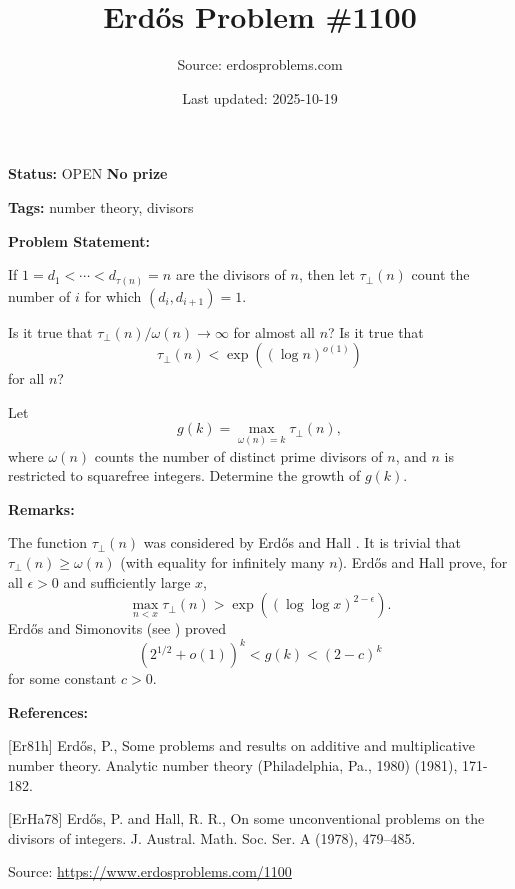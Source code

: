 \documentclass{article}
\title{Erd\H{o}s Problem \#1100}
\date{Last updated: 2025-10-19}
\author{Source: erdosproblems.com}
\begin{document}
\maketitle

\noindent\textbf{Status:} OPEN \quad \textbf{No prize}

\noindent\textbf{Tags:} number theory, divisors

\medskip
\noindent\textbf{Problem Statement:}

If $1=d_1<\cdots<d_{\tau(n)}=n$ are the divisors of $n$, then let $\tau_\perp(n)$ count the number of $i$ for which $(d_i,d_{i+1})=1$.

Is it true that $\tau_\perp(n)/\omega(n)\to \infty$ for almost all $n$? Is it true that\[\tau_\perp(n)< \exp((\log n)^{o(1)})\]for all $n$?

Let\[g(k) = \max_{\omega(n)=k}\tau_\perp(n),\]where $\omega(n)$ counts the number of distinct prime divisors of $n$, and $n$ is restricted to squarefree integers. Determine the growth of $g(k)$.

\bigskip
\noindent\textbf{Remarks:}

The function $\tau_\perp(n)$ was considered by Erd\H{o}s and Hall \cite{ErHa78}. It is trivial that $\tau_\perp(n)\geq \omega(n)$ (with equality for infinitely many $n$). Erd\H{o}s and Hall prove, for all $\epsilon>0$ and sufficiently large $x$,\[\max_{n<x} \tau_\perp(n) > \exp((\log\log x)^{2-\epsilon}).\]Erd\H{o}s and Simonovits (see \cite{Er81h}) proved\[(2^{1/2}+o(1))^k < g(k) < (2-c)^k\]for some constant $c>0$.

\bigskip
\noindent\textbf{References:}

[Er81h] Erd\H{o}s, P., Some problems and results on additive and multiplicative
number theory. Analytic number theory (Philadelphia, Pa., 1980) (1981), 171-182.
 
 [ErHa78] Erd\H{o}s, P. and Hall, R. R., On some unconventional problems on the divisors of integers. J. Austral. Math. Soc. Ser. A (1978), 479--485.

\bigskip
\noindent\small{Source: \url{https://www.erdosproblems.com/1100}}
\end{document}
